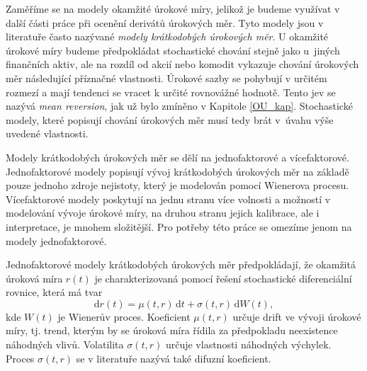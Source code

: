 \documentclass[a4paper,12pt]{report}
\theoremstyle{definition} \newtheorem{definice}[veta]{Definice}
\theoremstyle{remark}
\begin{document}
Zaměříme se na modely okamžité úrokové míry, jelikož je budeme využívat v další části práce při ocenění derivátů úrokových měr.
Tyto modely jsou v literatuře často nazývané \textit{modely krátkodobých úrokových měr}.
U okamžité úrokové míry budeme předpokládat stochastické chování stejně jako u~jiných finančních aktiv,
ale na rozdíl od akcií nebo komodit vykazuje chování úrokových měr následující příznačné vlastnosti. %
Úrokové sazby se pohybují v určitém rozmezí a %
mají tendenci se vracet k určité rovnovážné hodnotě.
Tento jev se nazývá \textit{mean reversion}, jak už bylo zmíněno v Kapitole \ref{OU_kap}. %
Stochastické modely, které popisují chování úrokových měr musí tedy brát v~úvahu výše uvedené vlastnosti.


Modely krátkodobých úrokových měr se dělí na jednofaktorové a vícefaktorové.
Jednofaktorové modely popisují vývoj krátkodobých úrokových měr na základě pouze jednoho zdroje nejistoty, který je modelován pomocí Wienerova procesu.
Vícefaktorové modely poskytují na jednu stranu více volnosti a možností v modelování vývoje úrokové míry, na druhou stranu jejich kalibrace, ale i interpretace, je mnohem složitější. 
Pro potřeby této práce se omezíme jenom na modely jednofaktorové. 

Jednofaktorové modely krátkodobých úrokových měr předpokládají, že okamžitá úroková míra $r(t)$ je charakterizovaná pomocí řešení stochastické diferenciální rovnice, která má tvar
\begin{equation}\label{model_urok_miry}
\mathrm{d}r(t)=\mu(t,r)\,\mathrm{d}t+\sigma(t,r)\,\mathrm{d}W(t),
\end{equation}
kde $W(t)$ je Wienerův proces.
Koeficient $\mu(t, r)$ určuje drift ve vývoji úrokové míry, tj. trend, kterým by se úroková míra řídila za předpokladu neexistence náhodných vlivů.
Volatilita $\sigma(t, r)$ určuje vlastnosti náhodných výchylek.
Proces $\sigma(t, r)$ se v literatuře nazývá také difuzní koeficient.
\end{document}
